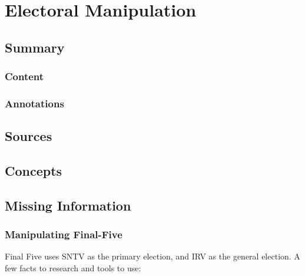 \chapter{Electoral Manipulation}

\section{Summary}

\subsection{Content}


\subsection{Annotations}

\section{Sources}


\section{Concepts}

\section{Missing Information}

\subsection{Manipulating Final-Five}

Final Five uses SNTV as the primary election, and IRV as the general election.  A few facts to research and tools to use:

